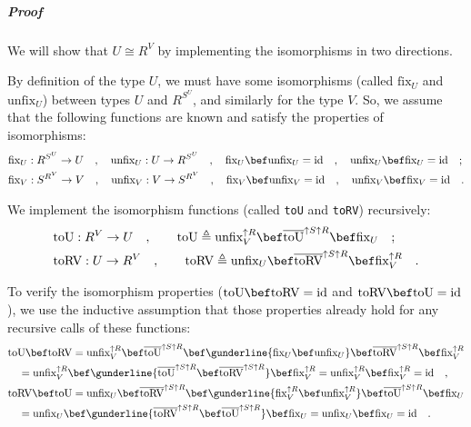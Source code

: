 \subparagraph{Proof}

We will show that $U\cong R^{V}$ by implementing the isomorphisms
in two directions. 

By definition of the type $U$, we must have some isomorphisms (called
$\text{fix}_{U}$ and $\text{unfix}_{U}$) between types $U$ and
$R^{S^{U}}$, and similarly for the type $V$. So, we assume that
the following functions are known and satisfy the properties of isomorphisms:
\begin{align*}
 & \text{fix}_{U}:R^{S^{U}}\rightarrow U\quad,\quad\text{unfix}_{U}:U\rightarrow R^{S^{U}}\quad,\quad\text{fix}_{U}\bef\text{unfix}_{U}=\text{id}\quad,\quad\text{unfix}_{U}\bef\text{fix}_{U}=\text{id}\quad;\\
 & \text{fix}_{V}:S^{R^{V}}\rightarrow V\quad,\quad\text{unfix}_{V}:V\rightarrow S^{R^{V}}\quad,\quad\text{fix}_{V}\bef\text{unfix}_{V}=\text{id}\quad,\quad\text{unfix}_{V}\bef\text{fix}_{V}=\text{id}\quad.
\end{align*}

We implement the isomorphism functions (called \lstinline!toU! and
\lstinline!toRV!) recursively:
\begin{align*}
 & \text{toU}:R^{V}\rightarrow U\quad,\quad\quad\text{toU}\triangleq\text{unfix}_{V}^{\uparrow R}\bef\overline{\text{toU}}^{\uparrow S\uparrow R}\bef\text{fix}_{U}\quad;\\
 & \text{toRV}:U\rightarrow R^{V}\quad,\quad\quad\text{toRV}\triangleq\text{unfix}_{U}\bef\overline{\text{toRV}}^{\uparrow S\uparrow R}\bef\text{fix}_{V}^{\uparrow R}\quad.
\end{align*}

To verify the isomorphism properties ($\text{toU}\bef\text{toRV}=\text{id}$
and $\text{toRV}\bef\text{toU}=\text{id}$), we use the inductive
assumption that those properties already hold for any recursive calls
of these functions:
\begin{align*}
 & \text{toU}\bef\text{toRV}=\text{unfix}_{V}^{\uparrow R}\bef\overline{\text{toU}}^{\uparrow S\uparrow R}\bef\gunderline{\text{fix}_{U}\bef\text{unfix}_{U}}\bef\overline{\text{toRV}}^{\uparrow S\uparrow R}\bef\text{fix}_{V}^{\uparrow R}\\
 & \quad=\text{unfix}_{V}^{\uparrow R}\bef\gunderline{\overline{\text{toU}}^{\uparrow S\uparrow R}\bef\overline{\text{toRV}}^{\uparrow S\uparrow R}}\bef\text{fix}_{V}^{\uparrow R}=\text{unfix}_{V}^{\uparrow R}\bef\text{fix}_{V}^{\uparrow R}=\text{id}\quad,\\
 & \text{toRV}\bef\text{toU}=\text{unfix}_{U}\bef\overline{\text{toRV}}^{\uparrow S\uparrow R}\bef\gunderline{\text{fix}_{V}^{\uparrow R}\bef\text{unfix}_{V}^{\uparrow R}}\bef\overline{\text{toU}}^{\uparrow S\uparrow R}\bef\text{fix}_{U}\\
 & \quad=\text{unfix}_{U}\bef\gunderline{\overline{\text{toRV}}^{\uparrow S\uparrow R}\bef\overline{\text{toU}}^{\uparrow S\uparrow R}}\bef\text{fix}_{U}=\text{unfix}_{U}\bef\text{fix}_{U}=\text{id}\quad.
\end{align*}


